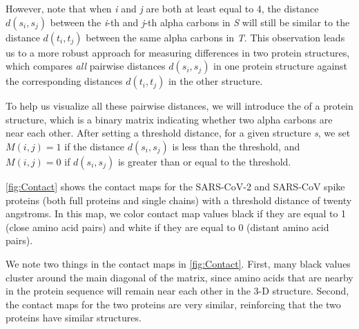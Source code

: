 However, note that when \textit{i} and \textit{j} are both at least equal to 4, the distance $d(s_{i}, s_{j})$ between the \textit{i}-th and \textit{j}-th alpha carbons in \textit{S} will still be similar to the distance $d(t_{i}, t_{j})$ between the same alpha carbons in \textit{T}. This observation leads us to a more robust approach for measuring differences in two protein structures, which compares \textit{all} pairwise distances $d(s_{i}, s_{j})$ in one protein structure against the corresponding distances $d(t_{i}, t_{j})$ in the other structure.

To help us visualize all these pairwise distances, we will introduce the  of a protein structure, which is a binary matrix indicating whether two alpha carbons are near each other. After setting a threshold distance, for a given structure \textit{s}, we set $M(i, j) = 1$ if the distance $d(s_{i}, s_{j})$ is less than the threshold, and $M(i, j) = 0$ if $d(s_{i}, s_{j})$ is greater than or equal to the threshold.

\autoref{fig:Contact} shows the contact maps for the SARS-CoV-2 and SARS-CoV spike proteins (both full proteins and single chains) with a threshold distance of twenty angstroms. In this map, we color contact map values black if they are equal to 1 (close amino acid pairs) and white if they are equal to 0 (distant amino acid pairs).

We note two things in the contact maps in \autoref{fig:Contact}. First, many black values cluster around the main diagonal of the matrix, since amino acids that are nearby in the protein sequence will remain near each other in the 3-D structure. Second, the contact maps for the two proteins are very similar, reinforcing that the two proteins have similar structures.

\begin{note}\end{note}

